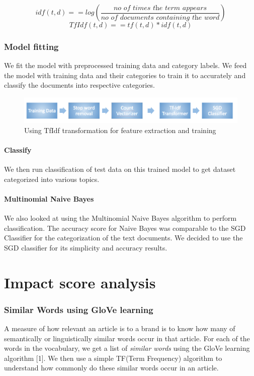 \documentclass[paper=a4, fontsize=11pt]{scrartcl}
\numberwithin{equation}{section}		%
\numberwithin{figure}{section}			%
\numberwithin{table}{section}				%
\begin{document}
 \[idf(t,d) =  = log(\frac{\textit{no of times the term appears} }{\textit{no of documents containing the word}})\]
  \[TfIdf(t,d) =  = tf(t,d) * idf(t,d)\]

\subsubsection{Model fitting}
We fit the model with preprocessed training data and category labels. We feed the model with training data and their categories to train it to accurately and classify the documents into respective categories. 
\begin{figure}[ht]
	\centering
 	 \includegraphics[width=0.5\linewidth]{feature-extraction-blue.png}
	  \caption{Using TfIdf transformation for feature extraction and training }
 	 \label{fig:Similar Words for NRA}
\end{figure}
\paragraph{Classify} We then run classification of test data on this trained model to get dataset categorized into various topics.

\paragraph{Multinomial Naive Bayes} We also looked at using the Multinomial Naive Bayes algorithm to perform classification. The accuracy score for Naive Bayes was comparable to the SGD Classifier for the categorization of the text documents.
We decided to use the SGD classifier for its simplicity and accuracy results.





\section{Impact score analysis}
\subsubsection {Similar Words using GloVe learning}
A measure of how relevant an article is to a brand is to know how many of semantically or linguistically similar words occur in that article. For each of the words in the vocabulary, we get a list of \textit{similar words} using the GloVe learning algorithm [1]. We then use a simple TF(Term Frequency) algorithm to understand how commonly do these similar words occur in an article.
\end{document}
